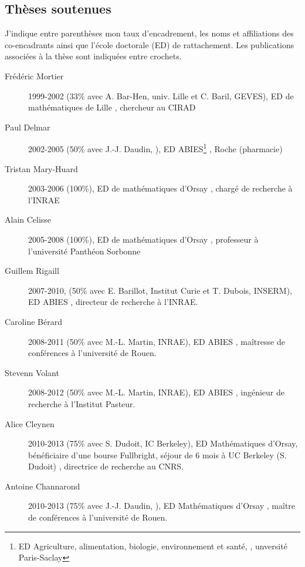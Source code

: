 \subsection{Thèses soutenues \label{app:phdencours}}

J'indique entre parenthèses mon taux d'encadrement, les noms et affiliations des co-encadrants ainsi que l'école doctorale (ED) de rattachement. Les publications associées à la thèse sont indiquées entre crochets.

\begin{description}
  \item[Frédéric Mortier] 1999-2002 (33\% avec A. Bar-Hen, univ. Lille et C. Baril, GEVES), ED de mathématiques de Lille \cite{MRL05}, chercheur au CIRAD
  \item[Paul Delmar] 2002-2005 (50\% avec J.-J. Daudin, \APT), ED ABIES\footnote{ED Agriculture, alimentation, biologie, environnement et santé, \APT, unversité Paris-Saclay} \cite{DRD05,DRL05}, Roche (pharmacie)
  \item[Tristan Mary-Huard] 2003-2006 (100\%), ED de mathématiques d'Orsay \cite{MDR04,MRD07,MaR09}, chargé de recherche à l'INRAE
  \item[Alain Celisse] 2005-2008 (100\%), ED de mathématiques d'Orsay \cite{CeR08,GRC09,CeR10}, professeur à l'université Panthéon Sorbonne
  \item[Guillem Rigaill] 2007-2010, (50\% avec E. Barillot, Institut Curie et T. Dubois, INSERM), ED ABIES \cite{RLR11,PLH11,VBG13,CKL14}, directeur de recherche à l'INRAE.
  \item[Caroline Bérard] 2008-2011 (50\% avec M.-L. Martin, INRAE), ED ABIES \cite{MMB08,BMT09,BMB11,RAB11,VBM13}, maîtresse de conférences à l'université de Rouen.
  \item[Stevenn Volant] 2008-2012 (50\% avec M.-L. Martin, INRAE), ED ABIES \cite{VMR12,VBM13}, ingénieur de recherche à l'Institut Pasteur.
  \item[Alice Cleynen] 2010-2013 (75\% avec S. Dudoit, IC Berkeley), ED Mathématiques d'Orsay,  bénéficiaire d'une bourse Fullbright, séjour de 6 mois à UC Berkeley (S. Dudoit) \cite{CDR13,CKL14,ClR16,GCR16}, directrice de recherche au CNRS.
  \item[Antoine Channarond] 2010-2013 (75\% avec J.-J. Daudin, \APT), ED Mathématiques d'Orsay \cite{CDR12}, maître de conférences à l'université de Rouen.

\end{description}
